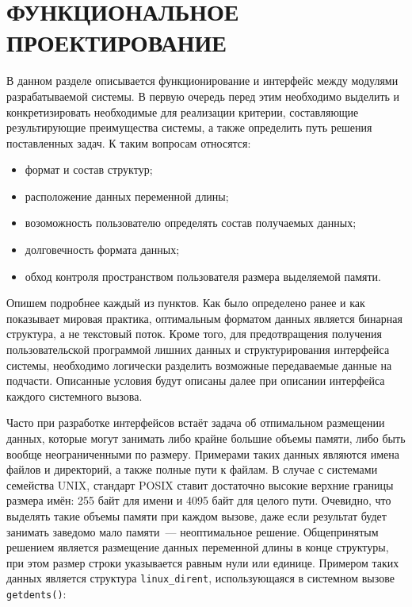\section{ФУНКЦИОНАЛЬНОЕ ПРОЕКТИРОВАНИЕ}
\label{sec:func}

В данном разделе описывается функционирование и интерфейс между модулями
разрабатываемой системы. В первую очередь перед этим необходимо выделить и
конкретизировать необходимые для реализации критерии, составляющие
результирующие преимущества системы, а также определить путь решения
поставленных задач. К таким вопросам относятся:

\begin{itemize}
\item формат и состав структур;
\item расположение данных переменной длины;
\item возоможность пользователю определять состав получаемых данных;
\item долговечность формата данных;
\item обход контроля пространством пользователя размера выделяемой памяти.
\end{itemize}

Опишем подробнее каждый из пунктов. Как было определено ранее и как показывает
мировая практика, оптимальным форматом данных является бинарная структура, а не
текстовый поток. Кроме того, для предотвращения получения пользовательской
программой лишних данных и структурирования интерфейса системы, необходимо
логически разделить возможные передаваемые данные на подчасти. Описанные условия
будут описаны далее при описании интерфейса каждого системного вызова.

Часто при разработке интерфейсов встаёт задача об отпимальном размещении данных,
которые могут занимать либо крайне большие объемы памяти, либо быть вообще
неограниченными по размеру. Примерами таких данных являются имена файлов и
директорий, а также полные пути к файлам. В случае с системами семейства UNIX,
стандарт POSIX ставит достаточно высокие верхние границы размера имён: 255 байт
для имени и 4095 байт для целого пути. Очевидно, что выделять такие объемы
памяти при каждом вызове, даже если результат будет занимать заведомо мало
памяти~--- неоптимальное решение. Общепринятым решением является размещение
данных переменной длины в конце структуры, при этом размер строки указывается
равным нули или единице. Примером таких данных является структура
\texttt{linux\_dirent}, использующаяся в системном вызове \texttt{getdents()}:


